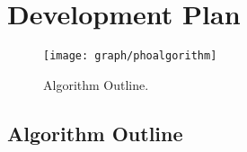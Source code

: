 \chapter{Development Plan}
\label{ch:developmentplan}

\begin{wrapfigure}{r}{0.4\textwidth}
  \vspace{-120pt}
  \begin{center}
    \texttt{[image: graph/phoalgorithm]}
  \end{center}
  \vspace{-20pt}
  \caption{Algorithm Outline.}
  \vspace{-10pt}
\end{wrapfigure}

\section{Algorithm Outline}

